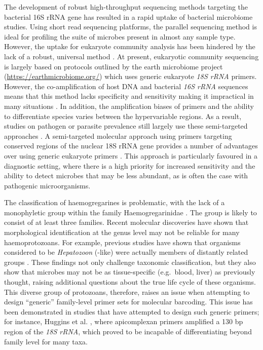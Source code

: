 \documentclass[a4paper, nobind]{templates/ociamthesis}
\begin{document}
The development of robust high-throughput sequencing methods targeting the bacterial 16S rRNA gene has resulted in a rapid uptake of bacterial microbiome studies.
Using short read sequencing platforms, the parallel sequencing method is ideal for profiling the suite of microbes present in almost any sample type.
However, the uptake for eukaryote community analysis has been hindered by the lack of a robust, universal method \autocite{hugerthSystematicDesign18S2014}.
At present, eukaryotic community sequencing is largely based on protocols outlined by the earth microbiome project (\url{https://earthmicrobiome.org/}) which uses generic eukaryote \emph{18S rRNA} primers.
However, the co-amplification of host DNA and bacterial \emph{16S rRNA} sequences means that this method lacks specificity and sensitivity making it impractical in many situations \autocite{kounosuImproved18S28S2019}.
In addition, the amplification biases of primers and the ability to differentiate species varies between the hypervariable regions.
As a result, studies on pathogen or parasite prevalence still largely use these semi-targeted approaches \autocite{ghafarTargetedNextGenerationSequencing2020,wahabNovelMetabarcoded18S2020}.
A semi-targeted molecular approach using primers targeting conserved regions of the nuclear 18S rRNA gene provides a number of advantages over using generic eukaryote primers \autocite{bradleyDesignEvaluationIllumina2016,cannonHighthroughputSequencingAssay2018a}.
This approach is particularly favoured in a diagnostic setting, where there is a high priority for increased sensitivity and the ability to detect microbes that may be less abundant, as is often the case with pathogenic microorganisms.

The classification of haemogregarines is problematic, with the lack of a monophyletic group within the family Haemogregarinidae \autocite{al-quraishyHaemogregarinesCriteriaIdentification2021}.
The group is likely to consist of at least three families.
Recent molecular discoveries have shown that morphological identification at the genus level may not be reliable for many haemoprotozoans.
For example, previous studies have shown that organisms considered to be \emph{Hepatozoon} (-like) were actually members of distantly related groups \autocite{merinoSarcocystidMisidentifiedHepatozoon2008,zhuLooksCanDeceive2009}.
These findings not only challenge taxonomic classification, but they also show that microbes may not be as tissue-specific (e.g.~blood, liver) as previously thought, raising additional questions about the true life cycle of these organisms.
This diverse group of protozoans, therefore, raises an issue when attempting to design ``generic'' family-level primer sets for molecular barcoding.
This issue has been demonstrated in studies that have attempted to design such generic primers; for instance, Huggins et al. \autocite*{hugginsNovelMetabarcodingDiagnostic2019}, where apicomplexan primers amplified a 130 bp region of the \emph{18S rRNA}, which proved to be incapable of differentiating beyond family level for many taxa.
\end{document}
